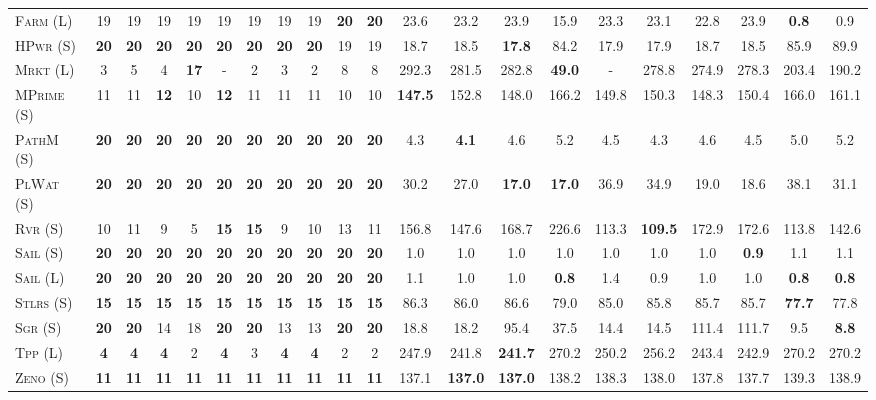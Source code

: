\begin{table}[tb]
{\begin{tabular}{|l||cccccccccc||cccccccccc||}
\textsc{Farm} (L)&19&19&19&19&19&19&19&19&\textbf{20}&\textbf{20}&23.6&23.2&23.9&15.9&23.3&23.1&22.8&23.9&\textbf{0.8}&0.9\\
\textsc{HPwr} (S)&\textbf{20}&\textbf{20}&\textbf{20}&\textbf{20}&\textbf{20}&\textbf{20}&\textbf{20}&\textbf{20}&19&19&18.7&18.5&\textbf{17.8}&84.2&17.9&17.9&18.7&18.5&85.9&89.9\\
\textsc{Mrkt} (L)&3&5&4&\textbf{17}&-&2&3&2&8&8&292.3&281.5&282.8&\textbf{49.0}&-&278.8&274.9&278.3&203.4&190.2\\
\textsc{MPrime} (S)&11&11&\textbf{12}&10&\textbf{12}&11&11&11&10&10&\textbf{147.5}&152.8&148.0&166.2&149.8&150.3&148.3&150.4&166.0&161.1\\
\textsc{PathM} (S)&\textbf{20}&\textbf{20}&\textbf{20}&\textbf{20}&\textbf{20}&\textbf{20}&\textbf{20}&\textbf{20}&\textbf{20}&\textbf{20}&4.3&\textbf{4.1}&4.6&5.2&4.5&4.3&4.6&4.5&5.0&5.2\\
\textsc{PlWat} (S)&\textbf{20}&\textbf{20}&\textbf{20}&\textbf{20}&\textbf{20}&\textbf{20}&\textbf{20}&\textbf{20}&\textbf{20}&\textbf{20}&30.2&27.0&\textbf{17.0}&\textbf{17.0}&36.9&34.9&19.0&18.6&38.1&31.1\\
\textsc{Rvr} (S)&10&11&9&5&\textbf{15}&\textbf{15}&9&10&13&11&156.8&147.6&168.7&226.6&113.3&\textbf{109.5}&172.9&172.6&113.8&142.6\\
\textsc{Sail} (S)&\textbf{20}&\textbf{20}&\textbf{20}&\textbf{20}&\textbf{20}&\textbf{20}&\textbf{20}&\textbf{20}&\textbf{20}&\textbf{20}&1.0&1.0&1.0&1.0&1.0&1.0&1.0&\textbf{0.9}&1.1&1.1\\
\textsc{Sail} (L)&\textbf{20}&\textbf{20}&\textbf{20}&\textbf{20}&\textbf{20}&\textbf{20}&\textbf{20}&\textbf{20}&\textbf{20}&\textbf{20}&1.1&1.0&1.0&\textbf{0.8}&1.4&0.9&1.0&1.0&\textbf{0.8}&\textbf{0.8}\\
\textsc{Stlrs} (S)&\textbf{15}&\textbf{15}&\textbf{15}&\textbf{15}&\textbf{15}&\textbf{15}&\textbf{15}&\textbf{15}&\textbf{15}&\textbf{15}&86.3&86.0&86.6&79.0&85.0&85.8&85.7&85.7&\textbf{77.7}&77.8\\
\textsc{Sgr} (S)&\textbf{20}&\textbf{20}&14&18&\textbf{20}&\textbf{20}&13&13&\textbf{20}&\textbf{20}&18.8&18.2&95.4&37.5&14.4&14.5&111.4&111.7&9.5&\textbf{8.8}\\
\textsc{Tpp} (L)&\textbf{4}&\textbf{4}&\textbf{4}&2&\textbf{4}&3&\textbf{4}&\textbf{4}&2&2&247.9&241.8&\textbf{241.7}&270.2&250.2&256.2&243.4&242.9&270.2&270.2\\
\textsc{Zeno} (S)&\textbf{11}&\textbf{11}&\textbf{11}&\textbf{11}&\textbf{11}&\textbf{11}&\textbf{11}&\textbf{11}&\textbf{11}&\textbf{11}&137.1&\textbf{137.0}&\textbf{137.0}&138.2&138.3&138.0&137.8&137.7&139.3&138.9\\

\end{tabular}}
\end{table}
